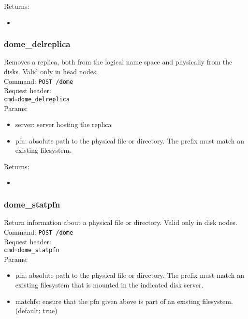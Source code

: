 \documentclass[a4paper,10pt]{scrreprt}
\begin{document}
Returns:
\begin{itemize}
 \item 
\end{itemize}


\subsubsection{dome\_delreplica}

Removes a replica, both from the logical name space and physically from the disks. Valid only in head nodes.\\
Command:
\lstinline"POST /dome"\\
Request header:\\
\lstinline"cmd=dome_delreplica"\\
Params:
\begin{itemize}
 \item server: server hosting the replica
 \item pfn: absolute path to the physical file or directory. The prefix must match an existing filesystem.
\end{itemize}

Returns:
\begin{itemize}
 \item 
\end{itemize}

 
 
 
 
 
 
 
 
 
 
 
 

\subsubsection{dome\_statpfn}
Return information about a physical file or directory. Valid only in disk nodes.\\
Command:
\lstinline"POST /dome"\\
Request header:\\
\lstinline"cmd=dome_statpfn"\\
Params:
\begin{itemize}
 \item pfn: absolute path to the physical file or directory. The prefix must match an existing filesystem that is mounted in the indicated disk server.
 \item matchfs: ensure that the pfn given above is part of an existing filesystem. (default: true)
\end{itemize}
\end{document}
